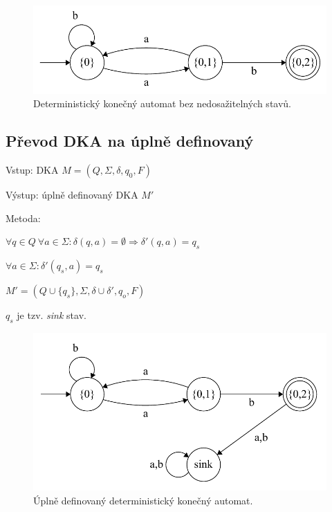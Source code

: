 \begin{figure}[H]
    \centering
    \includegraphics[width=0.75\linewidth]{dka.pdf}
    \caption{Deterministický konečný automat bez nedosažitelných stavů.}
\end{figure}

\subsection{Převod DKA na úplně definovaný}

\begin{compactitem}
    \item Vstup: DKA $M = (Q, \Sigma, \delta, q_0, F)$
    \item Výstup: úplně definovaný DKA $M'$
    \item Metoda: \begin{compactenum}
        \item $\forall q \in Q ~ \forall a \in \Sigma : \delta(q, a) = \emptyset \Rightarrow \delta'(q, a) = q_s$
        \item $\forall a \in \Sigma : \delta'(q_s, a) = q_s$
        \item $M' = (Q \cup \{ q_s \}, \Sigma, \delta \cup \delta', q_o, F)$
    \end{compactenum}
    \item $q_s$ je tzv. \textit{sink} stav.
\end{compactitem}

\begin{figure}[H]
    \centering
    \includegraphics[width=0.75\linewidth]{dka_uplny_sink.pdf}
    \caption{Úplně definovaný deterministický konečný automat.}
\end{figure}

